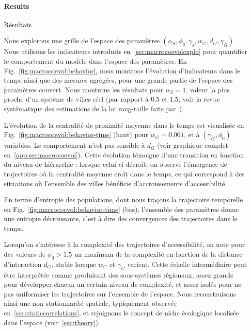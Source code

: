 \paragraph{Results}{Résultats}



Nous explorons une grille de l'espace des paramètres $(\alpha_S,\phi_0,\gamma_s,w_G,d_G,\gamma_G)$. Nous utilisons les indicateurs introduits en~\ref{sec:macrocoevolexplo} pour quantifier le comportement du modèle dans l'espace des paramètres. En Fig.~\ref{fig:macrocoevol:behavior}, nous montrons l'évolution d'indicateurs dans le temps ainsi que des mesures agrégées, pour une grande partie de l'espace des paramètres couvert. Nous montrons les résultats pour $\alpha_S = 1$, valeur la plus proche d'un système de villes réel (par rapport à 0.5 et 1.5, voir la revue systématique des estimations de la loi rang-taille faite par~\cite{10.1371/journal.pone.0183919}).


L'évolution de la centralité de proximité moyenne dans le temps est visualisée en Fig.~\ref{fig:macrocoevol:behavior-time} (haut) pour $w_G = 0.001$, et à $(\gamma_G,\phi_0)$ variables. Le comportement n'est pas sensible à $d_G$ (voir graphique complet en~\ref{app:sec:macrocoevol}). Cette évolution témoigne d'une transition en fonction du niveau de hiérarchie : lorsque celui-ci décroit, on observe l'émergence de trajectoires où la centralité moyenne croît dans le temps, ce qui correspond à des situations où l'ensemble des villes bénéficie d'accroissements d'accessibilité.



En terme d'entropie des populations, dont nous traçons la trajectoire temporelle en Fig.~\ref{fig:macrocoevol:behavior-time} (bas), l'ensemble des paramètres donne une entropie décroissante, c'est à dire des convergences des trajectoires dans le temps.


Lorsqu'on s'intéresse à la complexité des trajectoires d'accessibilité, on note pour des valeurs de $\phi_0 > 1.5$ un maximum de la complexité en fonction de la distance d'interaction $d_G$, stable lorsque $w_G$ et $\gamma_G$ varient. Cette échelle intermédiaire peut être interprétée comme produisant des sous-systèmes régionaux, assez grands pour développer chacun un certain niveau de complexité, et assez isolés pour ne pas uniformiser les trajectoires sur l'ensemble de l'espace. Nous reconstruisons ainsi une non-stationnarité spatiale, typiquement observée en~\ref{sec:staticcorrelations}, et rejoignons le concept de niche écologique localisée dans l'espace (voir~\ref{sec:theory}).



